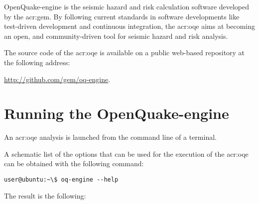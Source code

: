OpenQuake-engine is the seismic hazard and risk calculation software developed by
the \glsdesc{acr:gem}. By following current standards in software
developments like test-driven development and continuous integration, the
\glsdesc{acr:oqe} aims at becoming an open, and community-driven tool for
seismic hazard and risk analysis.

The source code of the \glsdesc{acr:oqe} is available on a public web-based
repository at the following address:

\href{http://github.com/gem/oq-engine}{http://github.com/gem/oq-engine}.


\section{Running the OpenQuake-engine}
\label{sec:running_oq_engine}

An \gls{acr:oqe} analysis is launched from the command line of a terminal.

A schematic list of the options that can be used for the execution of the
\gls{acr:oqe} can be obtained with the following command:

\begin{verbatim}
user@ubuntu:~\$ oq-engine --help
\end{verbatim}

The result is the following:

\inputminted[firstline=1,fontsize=\footnotesize,frame=single]{shell-session}{oqum/help.txt}\\